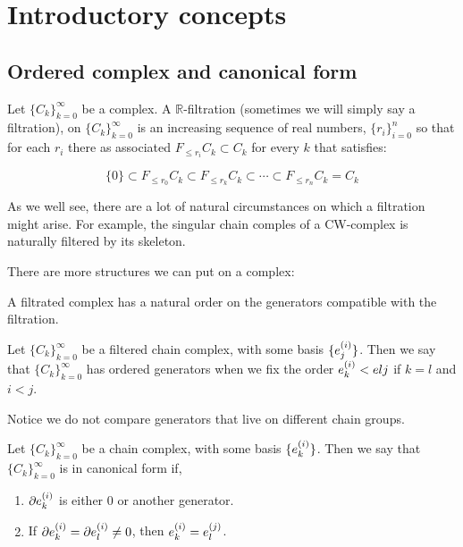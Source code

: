 \chapter{Introductory concepts}

\newcommand{\R}{\mathbb{R}}

\section{Ordered complex and canonical form}


\begin{definition}[$\R$-Filtered complex]
Let $\{C_k\}_{k=0}^{\infty}$ be a complex. 
A $\R$-filtration (sometimes we will simply say a filtration), on $\{C_k\}_{k=0}^{\infty}$ 
is an increasing sequence of real numbers, $\{r_i\}_{i=0}^n$
so that for each $r_i$ there as associated $F_{\leq r_i}C_k\subset C_k$ for every $k$
that satisfies:

$$
\{0\}\subset
F_{\leq r_0}C_k
\subset
F_{\leq r_k}C_k
\subset
\cdots
\subset
F_{\leq r_n}C_k
=
C_k
$$
\end{definition}

As we well see, there are a lot of natural circumstances on which a filtration might arise. For example, 
the singular chain comples of a CW-complex is naturally filtered by its skeleton.

There are more structures we can put on a complex:


\begin{remark}
A filtrated complex has a natural order on the generators compatible with the filtration.
\end{remark}

\begin{definition}

Let $\{C_k\}_{k=0}^{\infty}$ be a filtered chain complex, with some basis $\{e_{j}^{(i)}\}$.
Then we say that $\{C_k\}_{k=0}^{\infty}$ has ordered generators when we fix the order 
$e_{k}^{(i)}<e{l}{j}$ if  $k=l$ and $i<j$.

Notice we do not compare generators that live on different chain groups.
\end{definition}




\begin{definition}

Let $\{C_k\}_{k=0}^{\infty}$ be a chain complex, with some basis $\{e_{k}^{(i)}\}$.
Then we say that $\{C_k\}_{k=0}^{\infty}$ is in canonical form if,

\begin{enumerate}
\item $\partial e_{k}^{(i)}$
is either $0$ or another generator.

\item If $\partial e_{k}^{(i)}=\partial e_{l}^{(i)}\neq 0$,
then $e_{k}^{(i)}= e_{l}^{(j)}$.
\end{enumerate}

\end{definition}

